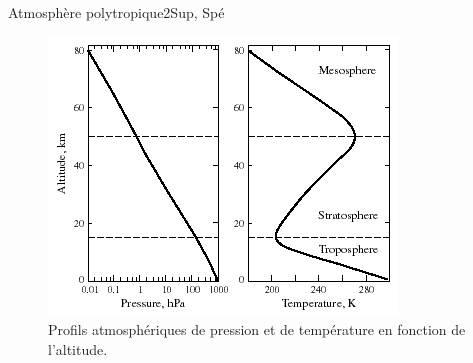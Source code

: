 \begin{exercise}{Atmosphère polytropique}{2}{Sup, Spé}
\begin{itemize}
\begin{figure}[H]
    \centering
    \includegraphics[scale=.85]{mecaflu/statiqueflu/polytrope.png}
    \vspace{-1.5em}
    \caption{Profils atmosphériques de pression et de température en fonction de l'altitude.}
\end{figure}
\end{itemize}
\end{exercise}